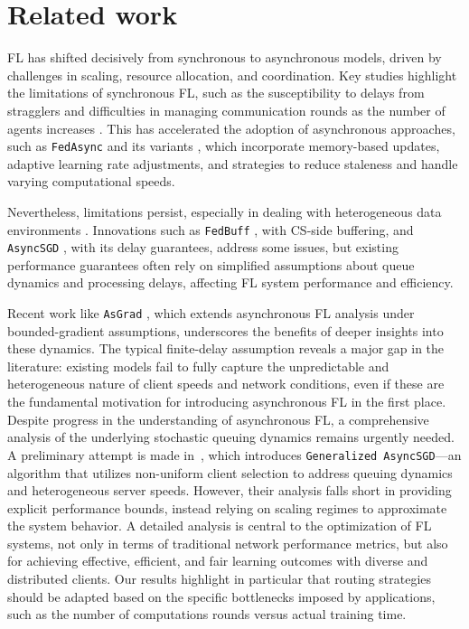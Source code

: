 \section{Related work}
\label{sec:related-work}

\gls{FL} has shifted decisively from synchronous \cite{wang2020tackling, qu2021feddq, makarenko2022adaptive, mao2022communication, tyurin2022dasha} to asynchronous models, driven by challenges in scaling, resource allocation, and coordination. Key studies highlight the limitations of synchronous \gls{FL}, such as the susceptibility to delays from stragglers and difficulties in managing communication rounds as the number of agents increases \cite{xie2019asynchronous}. This has accelerated the adoption of asynchronous approaches, such as \texttt{FedAsync} and its variants \cite{xie2019asynchronous, chen2020asynchronous, xu2021asynchronous}, which incorporate memory-based updates, adaptive learning rate adjustments, and strategies to reduce staleness and handle varying computational speeds.

Nevertheless, limitations persist, especially in dealing with heterogeneous data environments \cite{koloskova2022sharper}. Innovations such as \texttt{FedBuff} \cite{Nguyen2021FederatedLW}, with \gls{CS}-side buffering, and \texttt{AsyncSGD} \cite{koloskova2022sharper}, with its delay guarantees, address some issues, but existing performance guarantees often rely on simplified assumptions about queue dynamics and processing delays, affecting \gls{FL} system performance and efficiency.

Recent work like \texttt{AsGrad} \cite{islamov2023asgrad}, which extends asynchronous \gls{FL} analysis under bounded-gradient assumptions, underscores the benefits of deeper insights into these dynamics. The typical finite-delay assumption reveals a major gap in the literature: existing models fail to fully capture the unpredictable and heterogeneous nature of client speeds and network conditions, even if these are the fundamental motivation for introducing asynchronous \gls{FL} in the first place. Despite progress in the understanding of asynchronous FL, a comprehensive analysis of the underlying stochastic queuing dynamics remains urgently needed.
A preliminary attempt is made in~\cite{leconte2024queuing}, which introduces \texttt{Generalized AsyncSGD}—an algorithm that utilizes non-uniform client selection to address queuing dynamics and heterogeneous server speeds. However, their analysis falls short in providing explicit performance bounds, instead relying on scaling regimes to approximate the system behavior. A detailed analysis is central to the optimization of \gls{FL} systems, not only in terms of traditional network performance metrics, but also for achieving effective, efficient, and fair learning outcomes with diverse and distributed clients.
Our results highlight in particular that routing strategies should be adapted based on the specific bottlenecks imposed by applications, such as the number of computations rounds versus actual training time.